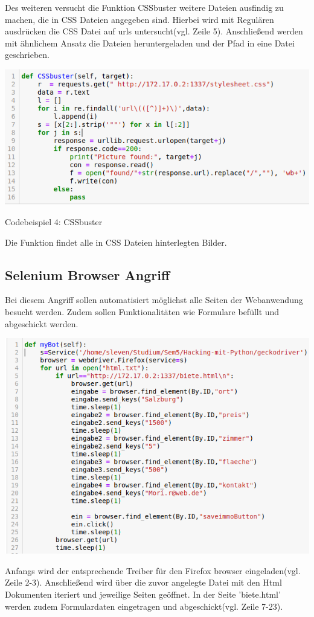 \documentclass[12pt]{article}
\begin{document}
Des weiteren versucht die Funktion CSSbuster weitere Dateien ausfindig zu machen, die in CSS Dateien angegeben sind. Hierbei wird mit Regulären ausdrücken die CSS Datei auf urls untersucht(vgl. Zeile 5). Anschließend werden mit ähnlichem Ansatz die Dateien heruntergeladen und der Pfad in eine Datei geschrieben.
\begin{center}
\includegraphics[scale=0.5]{data/cssbuster.png}
\end{center}
\begin{center}
 Codebeispiel 4: CSSbuster
\end{center}
Die Funktion findet alle in CSS Dateien hinterlegten Bilder.
\newpage
\subsection{Selenium Browser Angriff}
Bei diesem Angriff sollen automatisiert möglichst alle Seiten der Webanwendung besucht werden. Zudem sollen Funktionalitäten wie Formulare befüllt und abgeschickt werden.
\begin{center}
 \includegraphics[scale=0.5]{data/bot.png}
\end{center}
Anfangs wird der entsprechende Treiber für den Firefox browser eingeladen(vgl. Zeile 2-3). Anschließend wird über die zuvor angelegte Datei mit den Html Dokumenten iteriert und jeweilige Seiten geöffnet. In der Seite 'biete.html' werden zudem Formulardaten eingetragen und abgeschickt(vgl. Zeile 7-23).
\newpage
\end{document}

